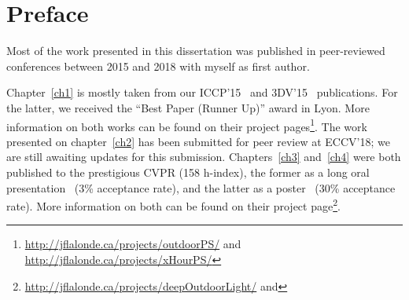 \chapter*{Preface}         %

Most of the work presented in this dissertation was published in peer-reviewed conferences between 2015 and 2018 with myself as first author. %


Chapter~\ref{ch1} is mostly taken from our ICCP'15~\cite{holdgeoffroy-iccp-15} and 3DV'15~\cite{holdgeoffroy-3dv-15} publications. For the latter, we received the ``Best Paper (Runner Up)'' award in Lyon. More information on both works can be found on their project pages\footnote{\url{http://jflalonde.ca/projects/outdoorPS/} and \url{http://jflalonde.ca/projects/xHourPS/}}. The work presented on chapter~\ref{ch2} has been submitted for peer review at ECCV'18; we are still awaiting updates for this submission. Chapters~\ref{ch3} and~\ref{ch4} were both published to the prestigious CVPR (158 h-index), the former as a long oral presentation~\cite{holdgeoffroy-cvpr-17} (3\% acceptance rate), and the latter as a poster~\cite{holdgeoffroy-cvpr-18} (30\% acceptance rate). More information on both can be found on their project page\footnote{\url{http://jflalonde.ca/projects/deepOutdoorLight/} and }.


%
%
